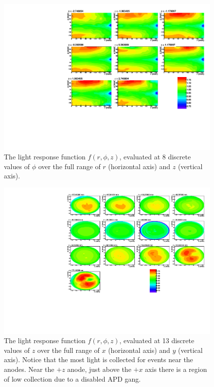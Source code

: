 \documentclass[herrin-thesis.tex]{subfiles}
\begin{document}
\begin{figure}
\centering
\includegraphics[width=\textwidth]{./plots/lightmap_correction_phi_slices.pdf}
\caption[Correction function \(\phi\) slices]{The light response function \(f(r,\phi,z)\), evaluated at 8 discrete values of \(\phi\) over the full range of \(r\) (horizontal axis) and \(z\) (vertical axis).}
\label{fig:lightmap_correction_phi_slices}
\end{figure}

\begin{figure}
\centering
\includegraphics[width=\textwidth]{./plots/lightmap_correction_z_slices.pdf}
\caption[Correction function \(z\) slices]{The light response function \(f(r,\phi,z)\), evaluated at 13 discrete values of \(z\) over the full range of \(x\) (horizontal axis) and \(y\) (vertical axis). Notice that the most light is collected for events near the anodes. Near the \(+z\) anode, just above the \(+x\) axis there is a region of low collection due to a disabled APD gang.}\label{fig:lightmap_correction_z_slices}
\end{figure}
\end{document}
